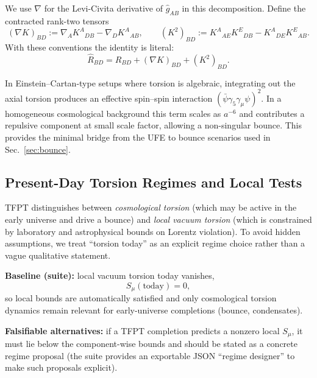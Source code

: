 \begin{tcolorbox}[colback=gray!5, colframe=gray!60,
title={\textbf{Notation: Ricci tensor under }\(\hat{\Gamma}=\Gamma(\hat{g})+K\)}, fonttitle=\bfseries\small]
We use $\nabla$ for the Levi-Civita derivative of $\hat{g}_{AB}$ in this decomposition.
Define the contracted rank-two tensors
\[
(\nabla K)_{BD}:=\nabla_A K^A{}_{DB}-\nabla_D K^A{}_{AB},
\qquad
(K^2)_{BD}:=K^A{}_{AE}K^E{}_{DB}-K^A{}_{DE}K^E{}_{AB}.
\]
With these conventions the identity is literal:
\[
\hat{R}_{BD}=R_{BD}+(\nabla K)_{BD}+(K^2)_{BD}.
\]
\end{tcolorbox}

\begin{tcolorbox}[colback=blue!3, colframe=blue!40,
    title={\textbf{Lemma (Torsion-Induced Bounce Term)}}, fonttitle=\bfseries\small]
In Einstein--Cartan-type setups where torsion is algebraic, integrating out the
axial torsion produces an effective spin--spin interaction
$(\bar{\psi}\gamma_5\gamma_\mu\psi)^2$. In a homogeneous cosmological background this term
scales as $a^{-6}$ and contributes a repulsive component at small scale factor,
allowing a non-singular bounce. This provides the minimal bridge from the UFE to
bounce scenarios used in Sec.~\ref{sec:bounce}.
\end{tcolorbox}

\subsection{Present-Day Torsion Regimes and Local Tests}
\label{sec:torsion-regimes}

TFPT distinguishes between \emph{cosmological torsion} (which may be active in the early universe and drive a bounce) and \emph{local vacuum torsion} (which is constrained by laboratory and astrophysical bounds on Lorentz violation).
To avoid hidden assumptions, we treat ``torsion today'' as an explicit regime choice rather than a vague qualitative statement.

\begin{tcolorbox}[colback=yellow!3, colframe=yellow!60!black,
    title={\textbf{Regime declaration (baseline vs.\ falsifiable alternatives)}}, fonttitle=\bfseries\small]
\textbf{Baseline (suite):} local vacuum torsion today vanishes,
\[
S_\mu(\text{today})=0,
\]
so local bounds are automatically satisfied and only cosmological torsion dynamics remain relevant for early-universe completions (bounce, condensates).

\textbf{Falsifiable alternatives:} if a TFPT completion predicts a nonzero local $S_\mu$, it must lie below the component-wise bounds and should be stated as a concrete regime proposal (the suite provides an exportable JSON ``regime designer'' to make such proposals explicit).
\end{tcolorbox}

